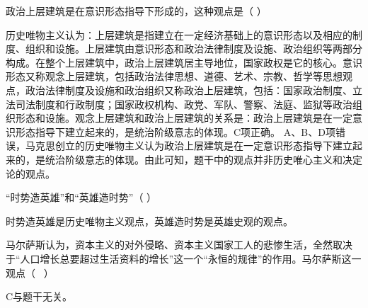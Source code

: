 \question 政治上层建筑是在意识形态指导下形成的，这种观点是（ ）
\par{}
\begin{solution}历史唯物主义认为：上层建筑是指建立在一定经济基础上的意识形态以及相应的制度、组织和设施。上层建筑由意识形态和政治法律制度及设施、政治组织等两部分构成。在整个上层建筑中，政治上层建筑居主导地位，国家政权是它的核心。意识形态又称观念上层建筑，包括政治法律思想、道德、艺术、宗教、哲学等思想观点，政治法律制度及设施和政治组织又称政治上层建筑，包括：国家政治制度、立法司法制度和行政制度；国家政权机构、政党、军队、警察、法庭、监狱等政治组织形态和设施。观念上层建筑和政治上层建筑的关系是：政治上层建筑是在一定意识形态指导下建立起来的，是统治阶级意志的体现。C项正确。
A、B、D项错误，马克思创立的历史唯物主义认为政治上层建筑是在一定意识形态指导下建立起来的，是统治阶级意志的体现。由此可知，题干中的观点并非历史唯心主义和决定论的观点。
\end{solution}
\question ``时势造英雄''和``英雄造时势''（ ）
\par{}
\begin{solution}时势造英雄是历史唯物主义观点，英雄造时势是英雄史观的观点。
\end{solution}
\question 马尔萨斯认为，资本主义的对外侵略、资本主义国家工人的悲惨生活，全然取决于``人口增长总要超过生活资料的增长''这一个``永恒的规律''的作用。马尔萨斯这一观点（
~）
\par{}
\begin{solution}C与题干无关。
\end{solution}
